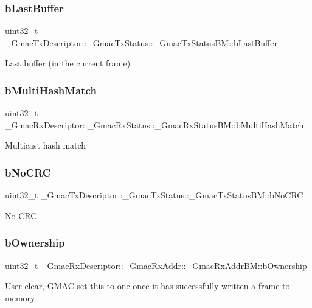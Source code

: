\subsubsection{\texorpdfstring{bLastBuffer}{bLastBuffer}}
{\footnotesize\ttfamily uint32\+\_\+t \+\_\+\+Gmac\+Tx\+Descriptor\+::\+\_\+\+Gmac\+Tx\+Status\+::\+\_\+\+Gmac\+Tx\+Status\+B\+M\+::b\+Last\+Buffer}

Last buffer (in the current frame) \mbox{\label{group__gmac__defines_gabce6f7c6f0579197591a3e606dfe292f}} 
\subsubsection{\texorpdfstring{bMultiHashMatch}{bMultiHashMatch}}
{\footnotesize\ttfamily uint32\+\_\+t \+\_\+\+Gmac\+Rx\+Descriptor\+::\+\_\+\+Gmac\+Rx\+Status\+::\+\_\+\+Gmac\+Rx\+Status\+B\+M\+::b\+Multi\+Hash\+Match}

Multicast hash match \mbox{\label{group__gmac__defines_ga5f287c86c213afb8d007d7e15b4c0390}} 
\subsubsection{\texorpdfstring{bNoCRC}{bNoCRC}}
{\footnotesize\ttfamily uint32\+\_\+t \+\_\+\+Gmac\+Tx\+Descriptor\+::\+\_\+\+Gmac\+Tx\+Status\+::\+\_\+\+Gmac\+Tx\+Status\+B\+M\+::b\+No\+C\+RC}

No C\+RC \mbox{\label{group__gmac__defines_gabe36538aa63ed4d083eb80dcaf9288e5}} 
\subsubsection{\texorpdfstring{bOwnership}{bOwnership}}
{\footnotesize\ttfamily uint32\+\_\+t \+\_\+\+Gmac\+Rx\+Descriptor\+::\+\_\+\+Gmac\+Rx\+Addr\+::\+\_\+\+Gmac\+Rx\+Addr\+B\+M\+::b\+Ownership}

User clear, G\+M\+AC set this to one once it has successfully written a frame to memory \mbox{\label{group__gmac__defines_ga0ab37f6aeafe77aaef506cc23e023a3d}} 
